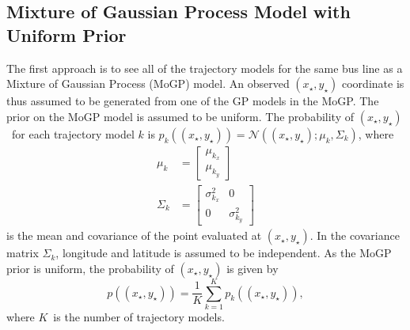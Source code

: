 \subsection{Mixture of Gaussian Process Model with Uniform Prior}
The first approach is to see all of the trajectory models for the same bus line as a Mixture of Gaussian Process (MoGP) model.
An observed $(x_\star, y_\star)$ coordinate is thus assumed to be generated from one of the GP models in the MoGP.
The prior on the MoGP model is assumed to be uniform.
The probability of $(x_\star, y_\star)$ for each trajectory model $k$ is 
\(
    p_k((x_\star,y_\star)) = \mathcal{N}((x_\star,y_\star); \mu_k, \Sigma_k)
\), where
\begin{align}
\mu_k &= \begin{bmatrix} \mu_{k_x} \\ \mu_{k_y} \end{bmatrix} \\
\Sigma_k &= \begin{bmatrix} \sigma^2_{k_x} & 0 \\ 0 & \sigma^2_{k_y} \end{bmatrix}
\end{align}
is the mean and covariance of the point evaluated at $(x_\star,y_\star)$.
In the covariance matrix $\Sigma_k$, longitude and latitude is assumed to be independent.
As the MoGP prior is uniform, the probability of $(x_\star, y_\star)$ is given by
\begin{equation}
    p((x_\star, y_\star)) = \frac{1}{K}\sum_{k=1}^K p_k((x_\star,y_\star)),
\end{equation}
where $K$ is the number of trajectory models.

